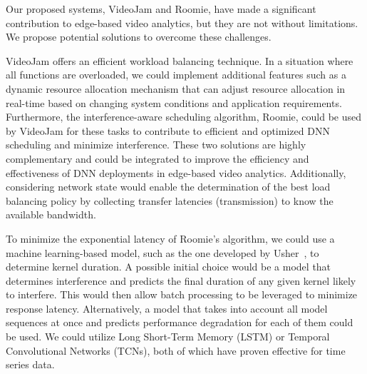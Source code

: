 Our proposed systems, VideoJam and Roomie, have made a significant contribution to edge-based video analytics, but they are not without limitations. We propose potential solutions to overcome these challenges.

VideoJam offers an efficient workload balancing technique. In a situation where all functions are overloaded, we could implement additional features such as a dynamic resource allocation mechanism that can adjust resource allocation in real-time based on changing system conditions and application requirements. Furthermore, the interference-aware scheduling algorithm, Roomie, could be used by VideoJam for these tasks to contribute to efficient and optimized DNN scheduling and minimize interference. These two solutions are highly complementary and could be integrated to improve the efficiency and effectiveness of DNN deployments in edge-based video analytics. Additionally, considering network state would enable the determination of the best load balancing policy by collecting transfer latencies (transmission) to know the available bandwidth.

To minimize the exponential latency of Roomie's algorithm, we could use a machine learning-based model, such as the one developed by Usher~\cite{shubha2024usher}, to determine kernel duration. A possible initial choice would be a model that determines interference and predicts the final duration of any given kernel likely to interfere. This would then allow batch processing to be leveraged to minimize response latency. Alternatively, a model that takes into account all model sequences at once and predicts performance degradation for each of them could be used. We could utilize Long Short-Term Memory (LSTM) or Temporal Convolutional Networks (TCNs), both of which have proven effective for time series data.



